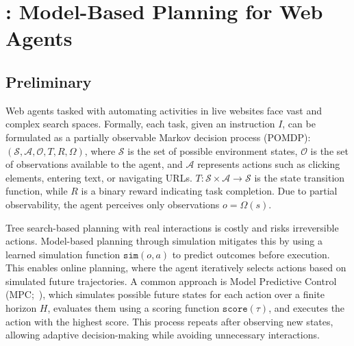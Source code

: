 

\section{\OurMethod: Model-Based Planning for Web Agents}
\label{sec:method}

\subsection{Preliminary}
\label{sec:planning}
Web agents tasked with automating activities in live websites face vast and complex search spaces. Formally, each task, given an instruction $I$, can be formulated as a partially observable Markov decision process (POMDP): $(\mathcal{S}, \mathcal{A}, \mathcal{O}, T, R, \Omega)$, where $\mathcal{S}$ is the set of possible environment states, $\mathcal{O}$ is the set of observations available to the agent, and $\mathcal{A}$ represents actions such as clicking elements, entering text, or navigating URLs.
$T: \mathcal{S} \times \mathcal{A} \to \mathcal{S}$ is the state transition function, while $R$ is a binary reward indicating task completion.
Due to partial observability, the agent perceives only observations $o = \Omega(s)$.

Tree search-based planning with real interactions is costly and risks irreversible actions.
Model-based planning through simulation mitigates this by using a learned simulation function $\texttt{sim}(o, a)$ to predict outcomes before execution.
This enables online planning, where the agent iteratively selects actions based on simulated future trajectories.
A common approach is Model Predictive Control (MPC;~\cite{garcia1989model}), which simulates possible future states for each action over a finite horizon $H$, evaluates them using a scoring function $\texttt{score}(\tau)$, and executes the action with the highest score.
This process repeats after observing new states, allowing adaptive decision-making while avoiding unnecessary interactions.


